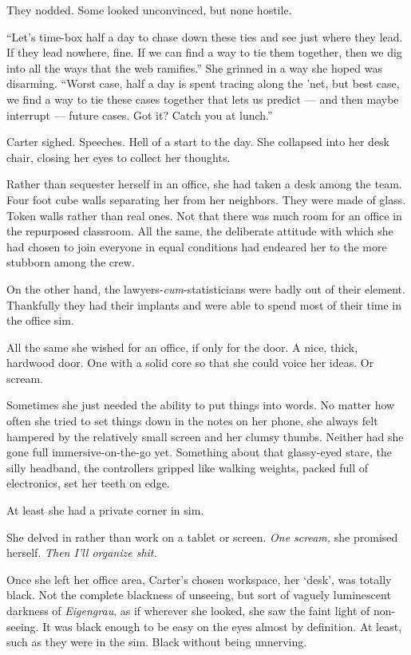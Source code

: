 They nodded. Some looked unconvinced, but none hostile.

``Let's time-box half a day to chase down these ties and see just where they lead. If they lead nowhere, fine. If we can find a way to tie them together, then we dig into all the ways that the web ramifies.'' She grinned in a way she hoped was disarming. ``Worst case, half a day is spent tracing along the 'net, but best case, we find a way to tie these cases together that lets us predict --- and then maybe interrupt --- future cases. Got it? Catch you at lunch.''

Carter sighed. Speeches. Hell of a start to the day. She collapsed into her desk chair, closing her eyes to collect her thoughts.

Rather than sequester herself in an office, she had taken a desk among the team. Four foot cube walls separating her from her neighbors. They were made of glass. Token walls rather than real ones. Not that there was much room for an office in the repurposed classroom. All the same, the deliberate attitude with which she had chosen to join everyone in equal conditions had endeared her to the more stubborn among the crew.

On the other hand, the lawyers-\emph{cum}-statisticians were badly out of their element. Thankfully they had their implants and were able to spend most of their time in the office sim.

All the same she wished for an office, if only for the door. A nice, thick, hardwood door. One with a solid core so that she could voice her ideas. Or scream.

Sometimes she just needed the ability to put things into words. No matter how often she tried to set things down in the notes on her phone, she always felt hampered by the relatively small screen and her clumsy thumbs. Neither had she gone full immersive-on-the-go yet. Something about that glassy-eyed stare, the silly headband, the controllers gripped like walking weights, packed full of electronics, set her teeth on edge.

At least she had a private corner in sim.

She delved in rather than work on a tablet or screen. \emph{One scream,} she promised herself. \emph{Then I'll organize shit.}

Once she left her office area, Carter's chosen workspace, her `desk', was totally black. Not the complete blackness of unseeing, but sort of vaguely luminescent darkness of \emph{Eigengrau}, as if wherever she looked, she saw the faint light of non-seeing. It was black enough to be easy on the eyes almost by definition. At least, such as they were in the sim. Black without being unnerving.

